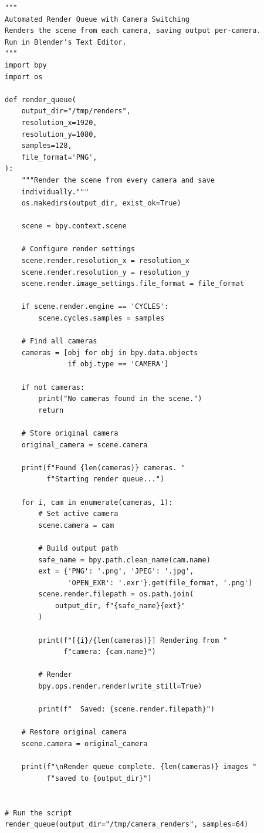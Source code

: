 \begin{lstlisting}
"""
Automated Render Queue with Camera Switching
Renders the scene from each camera, saving output per-camera.
Run in Blender's Text Editor.
"""
import bpy
import os

def render_queue(
    output_dir="/tmp/renders",
    resolution_x=1920,
    resolution_y=1080,
    samples=128,
    file_format='PNG',
):
    """Render the scene from every camera and save
    individually."""
    os.makedirs(output_dir, exist_ok=True)

    scene = bpy.context.scene

    # Configure render settings
    scene.render.resolution_x = resolution_x
    scene.render.resolution_y = resolution_y
    scene.render.image_settings.file_format = file_format

    if scene.render.engine == 'CYCLES':
        scene.cycles.samples = samples

    # Find all cameras
    cameras = [obj for obj in bpy.data.objects
               if obj.type == 'CAMERA']

    if not cameras:
        print("No cameras found in the scene.")
        return

    # Store original camera
    original_camera = scene.camera

    print(f"Found {len(cameras)} cameras. "
          f"Starting render queue...")

    for i, cam in enumerate(cameras, 1):
        # Set active camera
        scene.camera = cam

        # Build output path
        safe_name = bpy.path.clean_name(cam.name)
        ext = {'PNG': '.png', 'JPEG': '.jpg',
               'OPEN_EXR': '.exr'}.get(file_format, '.png')
        scene.render.filepath = os.path.join(
            output_dir, f"{safe_name}{ext}"
        )

        print(f"[{i}/{len(cameras)}] Rendering from "
              f"camera: {cam.name}")

        # Render
        bpy.ops.render.render(write_still=True)

        print(f"  Saved: {scene.render.filepath}")

    # Restore original camera
    scene.camera = original_camera

    print(f"\nRender queue complete. {len(cameras)} images "
          f"saved to {output_dir}")


# Run the script
render_queue(output_dir="/tmp/camera_renders", samples=64)
\end{lstlisting}

